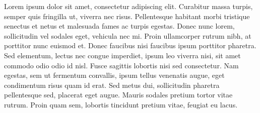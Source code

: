 Lorem ipsum dolor sit amet, consectetur adipiscing elit. Curabitur massa turpis,
semper quis fringilla ut, viverra nec risus. Pellentesque habitant morbi
tristique senectus et netus et malesuada fames ac turpis egestas. Donec nunc
lorem, sollicitudin vel sodales eget, vehicula nec mi. Proin ullamcorper rutrum
nibh, at porttitor nunc euismod et. Donec faucibus nisi faucibus ipsum porttitor
pharetra. Sed elementum, lectus nec congue imperdiet, ipsum leo viverra nisi, sit
amet commodo odio odio id nisl. Fusce sagittis lobortis nisi sed consectetur. Nam
egestas, sem ut fermentum convallis, ipsum tellus venenatis augue, eget
condimentum risus quam id erat. Sed metus dui, sollicitudin pharetra pellentesque
sed, placerat eget augue. Mauris sodales pretium tortor vitae rutrum. Proin quam
sem, lobortis tincidunt pretium vitae, feugiat eu lacus.
